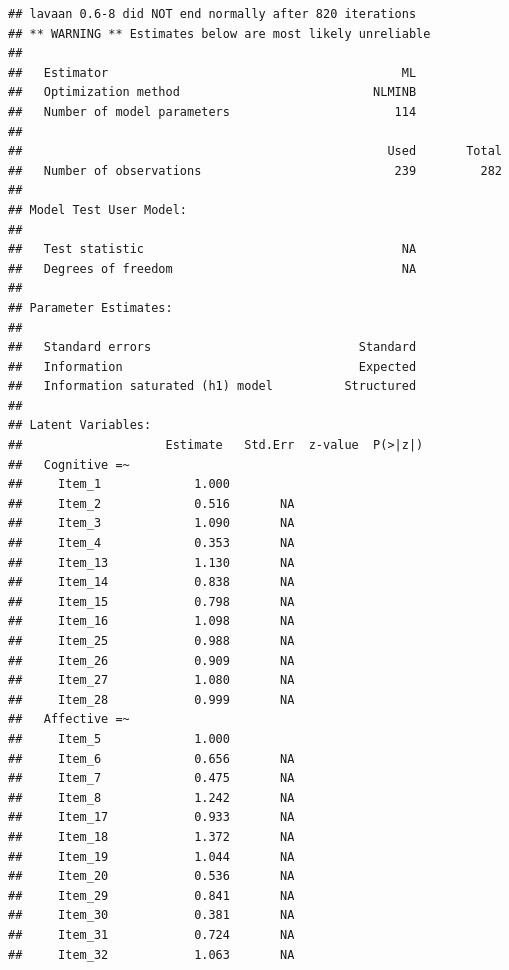 \documentclass[
]{book}
\begin{document}
\begin{verbatim}
## lavaan 0.6-8 did NOT end normally after 820 iterations
## ** WARNING ** Estimates below are most likely unreliable
## 
##   Estimator                                         ML
##   Optimization method                           NLMINB
##   Number of model parameters                       114
##                                                       
##                                                   Used       Total
##   Number of observations                           239         282
##                                                                   
## Model Test User Model:
##                                                       
##   Test statistic                                    NA
##   Degrees of freedom                                NA
## 
## Parameter Estimates:
## 
##   Standard errors                             Standard
##   Information                                 Expected
##   Information saturated (h1) model          Structured
## 
## Latent Variables:
##                    Estimate   Std.Err  z-value  P(>|z|)
##   Cognitive =~                                         
##     Item_1             1.000                           
##     Item_2             0.516       NA                  
##     Item_3             1.090       NA                  
##     Item_4             0.353       NA                  
##     Item_13            1.130       NA                  
##     Item_14            0.838       NA                  
##     Item_15            0.798       NA                  
##     Item_16            1.098       NA                  
##     Item_25            0.988       NA                  
##     Item_26            0.909       NA                  
##     Item_27            1.080       NA                  
##     Item_28            0.999       NA                  
##   Affective =~                                         
##     Item_5             1.000                           
##     Item_6             0.656       NA                  
##     Item_7             0.475       NA                  
##     Item_8             1.242       NA                  
##     Item_17            0.933       NA                  
##     Item_18            1.372       NA                  
##     Item_19            1.044       NA                  
##     Item_20            0.536       NA                  
##     Item_29            0.841       NA                  
##     Item_30            0.381       NA                  
##     Item_31            0.724       NA                  
##     Item_32            1.063       NA                  

\end{verbatim}
\end{document}
